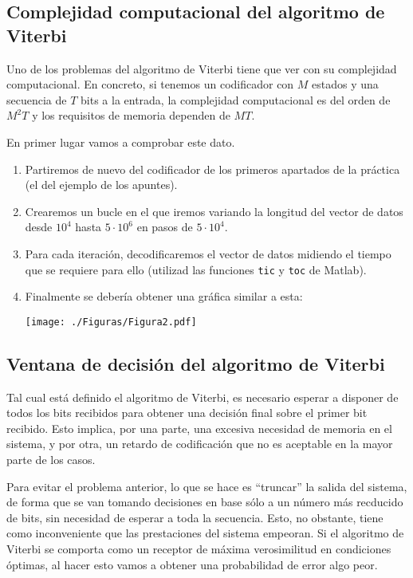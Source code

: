 \documentclass[es,practica]{uah}
\begin{document}
\subsection{Complejidad computacional del algoritmo de Viterbi}
Uno de los problemas del algoritmo de Viterbi tiene que ver con su complejidad computacional. En concreto, si tenemos un codificador con $M$ estados y una secuencia de $T$ bits a la entrada, la complejidad computacional es del orden de $M^2 T$ y los requisitos de memoria dependen de $MT$. 

En primer lugar vamos a comprobar este dato. 

\begin{enumerate}
	\item Partiremos de nuevo del codificador de los primeros apartados de la práctica (el del ejemplo de los apuntes).
	\item Crearemos un bucle en el que iremos variando la longitud del vector de datos desde $10^4$ hasta $5\cdot10^6$ en pasos de $5\cdot 10^4$. 
	\item Para cada iteración, decodificaremos el vector de datos midiendo el tiempo que se requiere para ello (utilizad las funciones \texttt{tic} y \texttt{toc} de Matlab).
	\item Finalmente se debería obtener una gráfica similar a esta:
	
	\centering\texttt{[image: ./Figuras/Figura2.pdf]}
\end{enumerate}


\subsection{Ventana de decisión del algoritmo de Viterbi}

Tal cual está definido el algoritmo de Viterbi, es necesario esperar a disponer de todos los bits recibidos para obtener una decisión final sobre el primer bit recibido. Esto implica, por una parte, una excesiva necesidad de memoria en el sistema, y por otra, un retardo de codificación que no es aceptable en la mayor parte de los casos. 

Para evitar el problema anterior, lo que se hace es ``truncar'' la salida del sistema, de forma que se van tomando decisiones en base sólo a un número más recducido de bits, sin necesidad de esperar a toda la secuencia. Esto, no obstante, tiene como inconveniente que las prestaciones del sistema empeoran. Si el algoritmo de Viterbi se comporta como un receptor de máxima verosimilitud en condiciones óptimas, al hacer esto vamos a obtener una probabilidad de error algo peor. 
\end{document}
